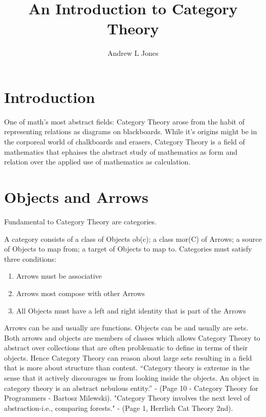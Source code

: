 \documentclass{article}
\title{An Introduction to Category Theory}
\author{Andrew L Jones}\date{}
\begin{document}
\maketitle



\section*{Introduction}
One of math's most abstract fields: Category Theory arose from the habit of representing relations as diagrams on blackboards. While it's origins might be in the corporeal world of chalkboards and erasers, Category Theory is a field of mathematics that ephaises the abstract study of mathematics as form and relation over the applied use of mathematics as calculation.


\section{Objects and Arrows}
Fundamental to Category Theory are categories.
\begin{definition}
A category consists of a class of Objects ob(c); a class mor(C) of Arrows; a source of Objects to map from; a target of Objects to map to. Categories must satisfy three conditions:
  \begin{enumerate}
    \item Arrows must be associative
    \item Arrows most compose with other Arrows
    \item All Objects must have a left and right identity that is part of the Arrows
  \end{enumerate}
\end{definition}
Arrows can be and usually are functions. Objects can be and usually are sets. Both arrows and objects are members of classes which allows Category Theory to abstract over collections that are often problematic to define in terms of their objects. Hence Category Theory can reason about large sets resulting in a field that is more about structure than content. “Category theory is extreme in the sense that it actively discourages us from looking inside the objects. An object in category theory is an abstract nebulous entity.” - (Page 10 - Category Theory for Programmers - Bartosz Milewski). "Category Theory involves the next level of abstraction-i.e., comparing forests." - (Page 1, Herrlich Cat Theory 2nd).
\end{document}
